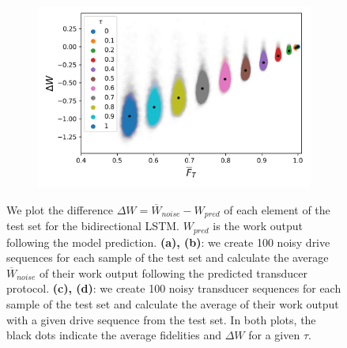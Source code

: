\begin{figure}[h]
\begin{subfigure}{0.4\textwidth}
	\end{subfigure}
	\begin{subfigure}{0.4\textwidth}
		\centering
		\includegraphics[width=\textwidth]{img/noisy_trans_dt_1}
	\end{subfigure}
	\caption{We plot the difference $\Delta W = \overline{W}_{noise} - W_{pred}$ of each element of the test set for the bidirectional LSTM. $W_{pred}$ is the work output following the model prediction. \textbf{(a), (b)}: we create 100 noisy drive sequences for each sample of the test set and calculate the average $\overline{W}_{noise}$ of their work output following the predicted transducer protocol. \textbf{(c), (d)}: we create 100 noisy transducer sequences for each sample of the test set and calculate the average of their work output with a given drive sequence from the test set. In both plots, the black dots indicate the average fidelities and $\Delta W$ for a given $\tau$.}
	\label{noisedt5}
\end{figure}